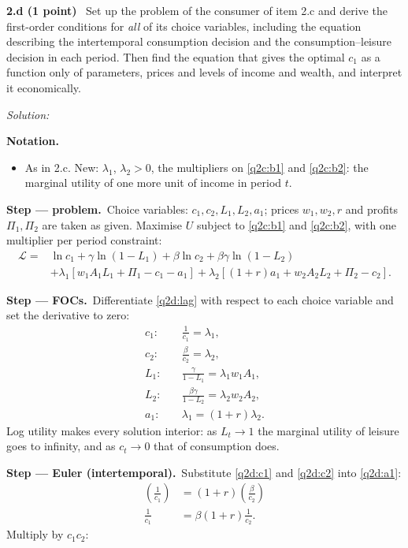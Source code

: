 \documentclass[11pt,a4paper]{article}
\newif\ifsolucoes
\newcommand{\sub}[2]{\Needspace{8\baselineskip}\par\medskip\noindent\textbf{#1 (#2)}~}
\newcommand{\resolespaco}[1][6cm]{\ifsolucoes\else\par\textit{Solution:}\vspace{#1}\par\fi}
\newcommand{\passo}[2]{\par\smallskip\noindent\textbf{Step --- #1.}~#2}
\newenvironment{notacao}{\par\smallskip\noindent\textbf{Notation.}\begin{itemize}[leftmargin=1.4em,topsep=1pt,itemsep=0pt]\small}{\end{itemize}}
\begin{document}
\sub{2.d}{1 point} Set up the problem of the consumer of item 2.c and derive the first-order
conditions for \emph{all} of its choice variables, including the equation describing the
intertemporal consumption decision and the consumption--leisure decision in each period. Then find
the equation that gives the optimal $c_1$ as a function only of parameters, prices and levels of
income and wealth, and interpret it economically.
\resolespaco[7cm]
\begin{sol}
\begin{notacao}
\item As in 2.c. New: $\lambda_1$, $\lambda_2>0$, the multipliers on \eqref{q2c:b1} and
\eqref{q2c:b2}: the marginal utility of one more unit of income in period $t$.
\end{notacao}
\passo{problem}{Choice variables: $c_1,c_2,L_1,L_2,a_1$; prices $w_1,w_2,r$ and profits
$\Pi_1,\Pi_2$ are taken as given. Maximise $U$ subject to \eqref{q2c:b1} and \eqref{q2c:b2}, with
one multiplier per period constraint:}
\begin{align}
\mathcal L={}&\ln c_1+\gamma\ln(1-L_1)+\beta\ln c_2+\beta\gamma\ln(1-L_2)\nonumber\\
&+\lambda_1\left[w_1A_1L_1+\Pi_1-c_1-a_1\right]+\lambda_2\left[(1+r)a_1+w_2A_2L_2+\Pi_2-c_2\right]. \label{q2d:lag}
\end{align}
\passo{FOCs}{Differentiate \eqref{q2d:lag} with respect to each choice variable and set the
derivative to zero:}
\begin{align}
c_1:&\quad \frac{1}{c_1}=\lambda_1, \label{q2d:c1}\\
c_2:&\quad \frac{\beta}{c_2}=\lambda_2, \label{q2d:c2}\\
L_1:&\quad \frac{\gamma}{1-L_1}=\lambda_1w_1A_1, \label{q2d:L1}\\
L_2:&\quad \frac{\beta\gamma}{1-L_2}=\lambda_2w_2A_2, \label{q2d:L2}\\
a_1:&\quad \lambda_1=(1+r)\lambda_2. \label{q2d:a1}
\end{align}
Log utility makes every solution interior: as $L_t\to1$ the marginal utility of leisure goes to
infinity, and as $c_t\to0$ that of consumption does.
\passo{Euler (intertemporal)}{Substitute \eqref{q2d:c1} and \eqref{q2d:c2} into \eqref{q2d:a1}:}
\begin{align*}
\left(\frac{1}{c_1}\right) &= (1+r)\left(\frac{\beta}{c_2}\right)\\
\frac{1}{c_1} &= \beta(1+r)\frac{1}{c_2}.
\end{align*}
Multiply by $c_1c_2$:
\begin{equation}

\end{equation}
\end{sol}
\end{document}
